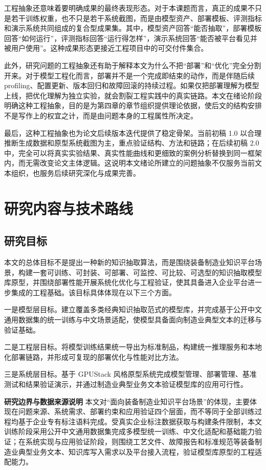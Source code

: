 工程抽象还意味着要明确成果的最终表现形态。对于本课题而言，真正的成果不只是若干训练权重，也不只是若干系统截图，而是由模型资产、部署模板、评测指标和演示系统共同组成的复合型成果集。其中，模型资产回答“能否抽取”，部署模板回答“如何运行”，评测指标回答“运行得怎样”，演示系统回答“能否被平台看见并被用户使用”。这种成果形态更接近工程项目中的可交付件集合。

此外，研究问题的工程抽象还有助于解释本文为什么不把“部署”和“优化”完全分割开来。对于模型工程化而言，部署并不是一个完成即结束的动作，而是伴随后续 profiling、配置更新、版本回归和故障回滚的持续过程。如果仅把部署理解为模型上线，把优化理解为独立实验，就会割裂工程实践中的真实链路。本文在绪论阶段明确这种工程抽象，目的是为第四章的章节组织提供理论依据，使后文的结构安排不是写作上的权宜之计，而是由问题本身的工程属性所决定。

最后，这种工程抽象也为论文后续版本迭代提供了稳定骨架。当前初稿 1.0 以合理推断生成数据和原型系统截图为主，重点验证结构、方法和链路；在后续初稿 2.0 中，完全可以将真实实验结果、真实性能曲线和更细致的案例分析替换到同一框架内，而无需改变论文主体逻辑。这说明本文绪论所建立的问题抽象不仅服务当前文本组织，也服务后续研究深化与成果完善。

\section{研究内容与技术路线}
\subsection{研究目标}
本文的总体目标不是提出一种新的知识抽取算法，而是围绕装备制造业知识平台场景，构建一套可训练、可封装、可部署、可监控、可比较、可选型的知识抽取模型库原型，并围绕部署性能开展系统化优化与工程验证，使其具备进入企业平台进一步集成的工程基础。该目标具体体现在以下三个方面。

一是模型层目标。建立覆盖多类经典知识抽取范式的模型库，并完成基于公开中文通用数据集的统一训练与中文场景适配，使模型具备面向制造业典型文本的迁移与验证基础。

二是工程层目标。将模型训练结果统一导出为标准制品，构建统一推理服务和本地化部署链路，并形成可复现的部署优化与性能对比方法。

三是系统层目标。基于 GPUStack 风格原型系统完成模型管理、部署管理、基准测试和结果验证演示，并通过制造业典型业务文本验证模型库的应用可行性。

\par\textbf{研究边界与数据来源说明}
本文对“面向装备制造业知识平台场景”的体现，主要体现在问题来源、系统需求、部署约束和应用验证四个层面，而不等同于全部训练过程均基于企业专有标注语料完成。受真实企业标注数据获取与构建条件限制，本文训练阶段采用公开中文通用数据集完成多模型统一训练、中文化适配和基础能力验证；在系统实现与应用验证阶段，则围绕工艺文件、故障报告和标准规范等装备制造业典型业务文本、知识库写入需求以及平台接入流程，验证模型库原型的工程适配能力。

